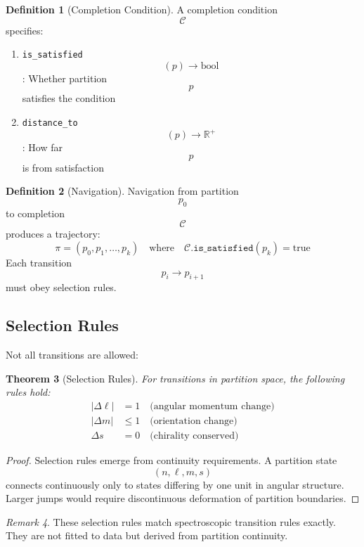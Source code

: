 \documentclass[11pt,twocolumn,a4paper]{article}
\newtheorem{theorem}{Theorem}[section]
\theoremstyle{definition}
\newtheorem{definition}[theorem]{Definition}
\theoremstyle{remark}
\newtheorem{remark}[theorem]{Remark}
\begin{document}
\begin{definition}[Completion Condition]
A completion condition $$\mathcal{C}$$ specifies:
\begin{enumerate}
    \item \texttt{is\_satisfied}$$(p) \to \text{bool}$$: Whether partition $$p$$ satisfies the condition
    \item \texttt{distance\_to}$$(p) \to \mathbb{R}^+$$: How far $$p$$ is from satisfaction
\end{enumerate}
\end{definition}

\begin{definition}[Navigation]
Navigation from partition $$p_0$$ to completion $$\mathcal{C}$$ produces a trajectory:
\begin{equation}
\pi = (p_0, p_1, \ldots, p_k) \quad \text{where} \quad \mathcal{C}.\texttt{is\_satisfied}(p_k) = \text{true}
\end{equation}
Each transition $$p_i \to p_{i+1}$$ must obey selection rules.
\end{definition}

\subsection{Selection Rules}

Not all transitions are allowed:

\begin{theorem}[Selection Rules]
\label{thm:selection}
For transitions in partition space, the following rules hold:
\begin{align}
|\Delta \ell| &= 1 \quad \text{(angular momentum change)} \\
|\Delta m| &\leq 1 \quad \text{(orientation change)} \\
\Delta s &= 0 \quad \text{(chirality conserved)}
\end{align}
\end{theorem}

\begin{proof}
Selection rules emerge from continuity requirements. A partition state $$(n, \ell, m, s)$$ connects continuously only to states differing by one unit in angular structure. Larger jumps would require discontinuous deformation of partition boundaries.
\end{proof}

\begin{remark}
These selection rules match spectroscopic transition rules exactly. They are not fitted to data but derived from partition continuity.
\end{remark}
\end{document}
